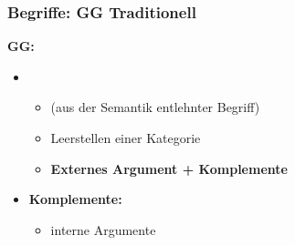 \begin{frame}
\frametitle{Begriffe: GG \vs Traditionell}

\begin{minipage}[b]{0.47\textwidth}

	\textbf{GG:}

	\begin{itemize}
		\item {}
		\begin{itemize}
			\item (aus der Semantik entlehnter Begriff)
			
			\item Leerstellen einer Kategorie 
			
			\item \textbf{Externes Argument + Komplemente}
		\end{itemize}
\medskip
		\item \textbf{Komplemente:}
		\begin{itemize}
			\item interne Argumente
		\end{itemize}

	\end{itemize}	
\end{minipage}  
\begin{minipage}[b]{0.5\textwidth}
	\begin{figure}
	\centering
	\end{figure}
\end{minipage}

\end{frame}


